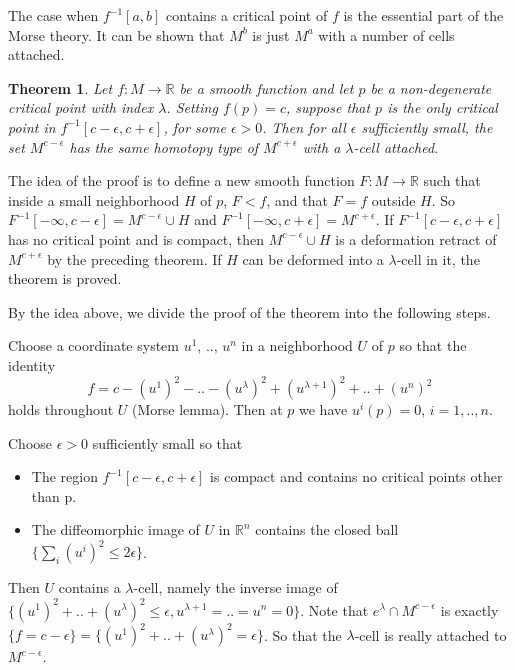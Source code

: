 \documentclass[a4paper,11pt,reqno]{amsart}
\newtheorem{thm}{Theorem}[section]
\newcommand{\RR}{\mathbb{R}}      %
\begin{document}
The case when $f^{-1}[a,b]$ contains a critical point of $f$ is the essential
part of the Morse theory. It can be shown that $M^b$ is just $M^a$ with a number
of cells attached.

\begin{thm}
  Let $f: M \to \RR$ be a smooth function and let $p$ be a non-degenerate
  critical point with index $\lambda$. Setting $f(p) = c$, suppose that $p$ is
  the only critical point in $f^{-1}[c-\epsilon, c+\epsilon]$, for some
  $\epsilon > 0$. Then for all $\epsilon$ sufficiently small, the set
  $M^{c-\epsilon}$ has the same homotopy type of $M^{c+\epsilon}$ with a
  $\lambda$-cell attached.
\end{thm}

The idea of the proof is to define a new smooth function $F: M \to \RR$ such
that inside a small neighborhood $H$ of $p$, $F < f$, and that $F = f$ outside
$H$. So $F^{-1}[-\infty, c-\epsilon] = M^{c-\epsilon} \cup H$ and
$F^{-1}[-\infty,c+\epsilon] = M^{c+\epsilon}$. If $F^{-1}[c-\epsilon,
c+\epsilon]$ has no critical point and is compact, then $M^{c-\epsilon} \cup H$
is a deformation retract of $M^{c+\epsilon}$ by the preceding theorem. If $H$
can be deformed into a $\lambda$-cell in it, the theorem is proved.

By the idea above, we divide the proof of the theorem into the following
steps.

Choose a coordinate system $u^1$, .., $u^n$ in a neighborhood $U$ of $p$ so that
the identity
\begin{equation}
  f = c - (u^1)^2 - .. - (u^{\lambda})^2 + (u^{\lambda+1})^2 + .. + (u^{n})^2
\end{equation}
holds throughout $U$ (Morse lemma). Then at $p$ we have $u^i(p) = 0$, $i = 1,
.., n$.

Choose $\epsilon > 0$ sufficiently small so that
\begin{itemize}
\item The region $f^{-1}[c-\epsilon,c+\epsilon]$ is compact and contains no
  critical points other than p.
\item The diffeomorphic image of $U$ in $\RR^n$ contains the closed ball
  $\{\sum_i (u^i)^2 \le 2\epsilon\}$.
\end{itemize}

Then $U$ contains a $\lambda$-cell, namely the inverse image of
$\{(u^1)^2+..+(u^{\lambda})^2 \le \epsilon, u^{\lambda+1}=..=u^{n} = 0\}$. Note
that $e^\lambda \cap M^{c-\epsilon}$ is exactly $\{f = c- \epsilon\} =
\{(u^1)^2+..+(u^\lambda)^2 = \epsilon \}$. So that the $\lambda$-cell is really
attached to $M^{c-\epsilon}$.
\end{document}
